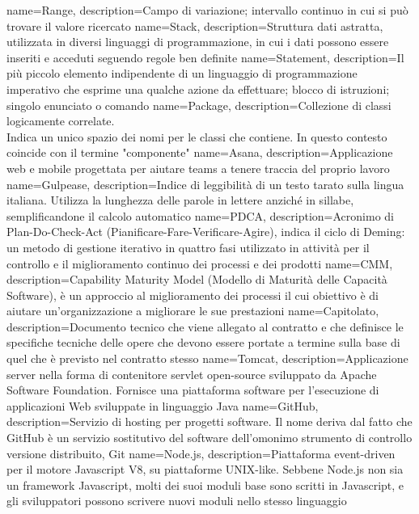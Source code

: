  {
	name=Range,
	description={Campo di variazione; intervallo continuo in cui si può trovare il valore
	ricercato}
}
 {
	name=Stack,
	description={Struttura dati astratta, utilizzata in diversi linguaggi di programmazione,
	in cui i dati possono essere inseriti e acceduti seguendo regole ben definite}
}
 {
	name=Statement,
	description={Il più piccolo elemento indipendente di un linguaggio di programmazione imperativo
	che esprime una qualche azione da effettuare; blocco di istruzioni;
	singolo enunciato o comando}
}
 {
	name=Package,
	description={Collezione di classi logicamente correlate.\\
	Indica un unico spazio dei nomi per le classi che contiene. In questo contesto coincide
	con il termine "componente"}
}
 {
	name=Asana,
	description={Applicazione web e mobile progettata per aiutare teams a tenere traccia del
	proprio lavoro}
}
 {
	name=Gulpease,
	description={Indice di leggibilità di un testo tarato sulla lingua italiana. Utilizza la
	lunghezza delle parole in lettere anziché in sillabe, semplificandone il calcolo automatico}
}
 {
	name=PDCA,
	description={Acronimo di Plan-Do-Check-Act (Pianificare-Fare-Verificare-Agire), indica il
	ciclo di Deming: un metodo di gestione iterativo in quattro fasi utilizzato in attività per
	il controllo e il miglioramento continuo dei processi e	dei prodotti}
}
 {
	name=CMM,
	description={Capability Maturity Model (Modello di Maturità delle Capacità Software), è
	un approccio al miglioramento dei processi il cui obiettivo è di aiutare un'organizzazione a
	migliorare le sue prestazioni}
}
 {
	name=Capitolato,
	description={Documento tecnico che viene allegato al contratto e che definisce le specifiche
	tecniche delle opere che devono essere portate a termine sulla base di quel che è previsto
	nel contratto stesso}
}
 {
	name=Tomcat,
	description={Applicazione server nella forma di contenitore servlet open-source sviluppato
	da Apache Software Foundation. Fornisce una piattaforma software per l'esecuzione di
	applicazioni Web sviluppate in linguaggio Java}
}
 {
	name=GitHub,
	description={Servizio di hosting per progetti software. Il nome deriva dal fatto che GitHub è
	un servizio sostitutivo del software dell'omonimo strumento di controllo
	versione distribuito, Git}
}
 {
	name=Node.js,
	description={Piattaforma event-driven per il motore Javascript V8, su piattaforme UNIX-like.
	Sebbene Node.js non sia un framework Javascript, molti dei suoi moduli base sono scritti in
	Javascript, e gli sviluppatori possono scrivere nuovi moduli nello stesso linguaggio}
}
